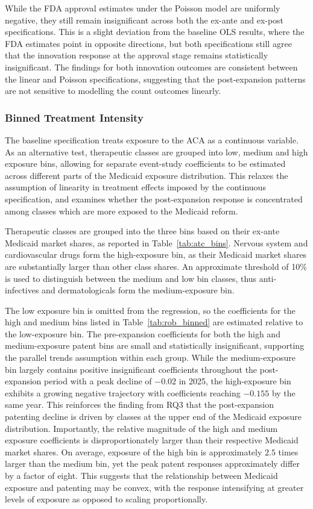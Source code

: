 \documentclass[12pt]{article}
\begin{document}
While the FDA approval estimates under the Poisson model are uniformly negative, they still remain insignificant across both the ex-ante and ex-post specifications. This is a slight deviation from the baseline OLS results, where the FDA estimates point in opposite directions, but both specifications still agree that the innovation response at the approval stage remains statistically insignificant. The findings for both innovation outcomes are consistent between the linear and Poisson specifications, suggesting that the post-expansion patterns are not sensitive to modelling the count outcomes linearly.

\subsubsection{Binned Treatment Intensity}

The baseline specification treats exposure to the ACA as a continuous variable. As an alternative test, therapeutic classes are grouped into low, medium and high exposure bins, allowing for separate event-study coefficients to be estimated across different parts of the Medicaid exposure distribution. This relaxes the assumption of linearity in treatment effects imposed by the continuous specification, and examines whether the post-expansion response is concentrated among classes which are more exposed to the Medicaid reform.

Therapeutic classes are grouped into the three bins based on their ex-ante Medicaid market shares, as reported in Table~\ref{tab:atc_bins}. Nervous system and cardiovascular drugs form the high-exposure bin, as their Medicaid market shares are substantially larger than other class shares. An approximate threshold of 10\% is used to distinguish between the medium and low bin classes, thus anti-infectives and dermatologicals form the medium-exposure bin.

The low exposure bin is omitted from the regression, so the coefficients for the high and medium bins listed in Table~\ref{tab:rob_binned} are estimated relative to the low-exposure bin. The pre-expansion coefficients for both the high and medium-exposure patent bins are small and statistically insignificant, supporting the parallel trends assumption within each group. While the medium-exposure bin largely contains positive insignificant coefficients throughout the post-expansion period with a peak decline of $-0.02$ in 2025, the high-exposure bin exhibits a growing negative trajectory with coefficients reaching $-0.155$ by the same year. This reinforces the finding from RQ3 that the post-expansion patenting decline is driven by classes at the upper end of the Medicaid exposure distribution. Importantly, the relative magnitude of the high and medium exposure coefficients is disproportionately larger than their respective Medicaid market shares. On average, exposure of the high bin is approximately $2.5$ times larger than the medium bin, yet the peak patent responses approximately differ by a factor of eight. This suggests that the relationship between Medicaid exposure and patenting may be convex, with the response intensifying at greater levels of exposure as opposed to scaling proportionally.
\end{document}
